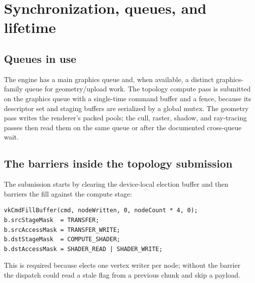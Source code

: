 \section{Synchronization, queues, and lifetime}
\label{sec:sync}

\subsection{Queues in use}

The engine has a main graphics queue and, when available, a distinct
graphics-family queue for geometry/upload work.  The topology compute
pass is submitted on the graphics queue with a single-time command buffer
and a fence, because its descriptor set and staging buffers are serialized
by a global mutex.  The geometry pass writes the renderer's packed pools;
the cull, raster, shadow, and ray-tracing passes then read them on the same
queue or after the documented cross-queue wait.

\subsection{The barriers inside the topology submission}

The submission starts by clearing the device-local election buffer and then
barriers the fill against the compute stage:
\begin{lstlisting}[style=glsl,caption={Election-buffer clear barrier.},label={lst:fillbarrier}]
vkCmdFillBuffer(cmd, nodeWritten, 0, nodeCount * 4, 0);
b.srcStageMask  = TRANSFER;
b.srcAccessMask = TRANSFER_WRITE;
b.dstStageMask  = COMPUTE_SHADER;
b.dstAccessMask = SHADER_READ | SHADER_WRITE;
\end{lstlisting}
This is required because  elects
one vertex writer per node; without the barrier the dispatch could read a
stale flag from a previous chunk and skip a payload.

